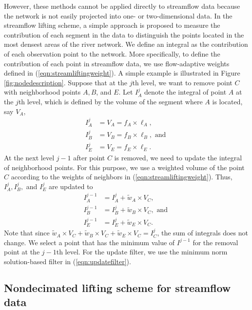 \documentclass[11pt,titlepage]{article}
\begin{document}
However, these methods cannot be applied directly to streamflow data because the network is not easily projected into one- or two-dimensional data. In the streamflow lifting scheme, a simple approach is proposed to measure the contribution of each segment in the data to distinguish the points located in the most densest areas of the river network. We define an integral as the contribution of each observation point to the network. More specifically, to define the contribution of each point in streamflow data, we use flow-adaptive weights defined in (\ref{eqn:streamliftingweight}). A simple example is illustrated in Figure \ref{fig:nodedescription}. Suppose that at the $j$th level, we want to remove point $C$ with neighborhood points $A, B$, and $E$. Let $I_A^{j}$ denote the integral of point $A$ at the $j$th level, which is defined by the volume of the segment where $A$ is located, say $V_A$,
\begin{align*}
I_A^{j} &= V_A = f_A\times \ell_A,\nonumber\\
I_B^{j} &= V_B = f_B\times \ell_B, \text{ and }\\
I_E^{j} &= V_E = f_E\times \ell_E.\nonumber
\end{align*}
At the next level $j-1$ after point $C$ is removed, we need to update the integral of neighborhood points. For this purpose, we use a weighted volume of the point $C$ according to the weights of neighbors in (\ref{eqn:streamliftingweight}). Thus, $I_A^{j}, I_{B}^{j},$ and $I_E^{j}$ are updated to
\begin{align*}
I_A^{j-1}&=I_A^{j} + \tilde{w}_A\times V_C,\nonumber\\
I_B^{j-1}&= I_B^{j} + \tilde{w}_B \times V_C, \text{ and }\\
I_E^{j-1} &= I_E^{j} + \tilde{w}_E \times V_C.\nonumber
\end{align*}
Note that since $\tilde{w}_A\times V_C +\tilde{w}_B \times V_C+ \tilde{w}_E \times V_C=I_C^{j}$, the sum of integrals does not  change. We select a point that has the minimum value of $I^{j-1}$ for the removal point at the $j-1$th level. For the update filter, we use the minimum norm solution-based filter in (\ref{eqn:updatefilter}).

\subsection{Nondecimated lifting scheme for streamflow data}
\end{document}
